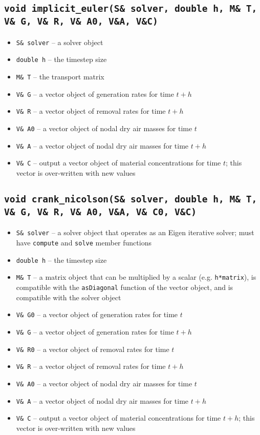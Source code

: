 \documentclass[10pt]{report}
\begin{document}
\subsection{\texttt{void implicit\_euler(S\& solver, double h, M\& T, V\& G, V\& R, V\& A0, V\&A, V\&C)}}
\begin{itemize}
\item \texttt{S\& solver} -- a solver object
\item \texttt{double h} -- the timestep size
\item \texttt{M\& T} -- the transport matrix
\item \texttt{V\& G} -- a vector object of generation rates for time $t+h$
\item \texttt{V\& R} -- a vector object of removal rates for time $t+h$
\item \texttt{V\& A0} -- a vector object of nodal dry air masses for time $t$
\item \texttt{V\& A} -- a vector object of nodal dry air masses for time $t+h$
\item \texttt{V\& C} -- output a vector object of material concentrations for time $t$; this vector is over-written with new values
\end{itemize}
\subsection{\texttt{void crank\_nicolson(S\& solver, double h, M\& T, V\& G, V\& R, V\& A0, V\&A, V\& C0, V\&C)}}
\begin{itemize}
\item \texttt{S\& solver} -- a solver object that operates as an Eigen iterative solver; must have \texttt{compute} and \texttt{solve} member functions
\item \texttt{double h} -- the timestep size
\item \texttt{M\& T} -- a matrix object that can be multiplied by a scalar (e.g. \texttt{h*matrix}), is compatible with the \texttt{asDiagonal} function of the vector object, and is compatible with the solver object
\item \texttt{V\& G0} -- a vector object of generation rates for time $t$
\item \texttt{V\& G} -- a vector object of generation rates for time $t+h$
\item \texttt{V\& R0} -- a vector object of removal rates for time $t$
\item \texttt{V\& R} -- a vector object of removal rates for time $t+h$
\item \texttt{V\& A0} -- a vector object of nodal dry air masses for time $t$
\item \texttt{V\& A} -- a vector object of nodal dry air masses for time $t+h$
\item \texttt{V\& C} -- output a vector object of material concentrations for time $t+h$; this vector is over-written with new values
\end{itemize}
\end{document}

